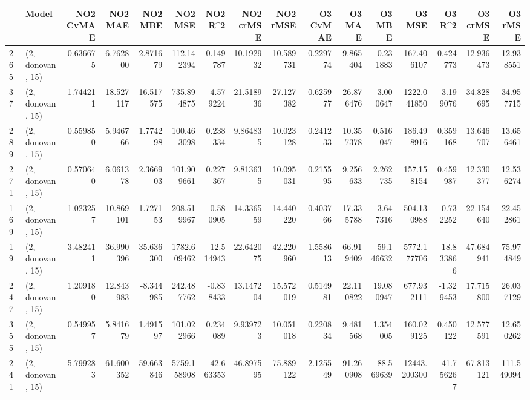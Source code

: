 \begin{tabular}{llrrrrrrrrrrrrrr}
\toprule
{} &             Model &  NO2 CvMAE &    NO2 MAE &    NO2 MBE &      NO2 MSE &    NO2 R\textasciicircum2 &  NO2 crMSE &   NO2 rMSE &  O3 CvMAE &     O3 MAE &     O3 MBE &        O3 MSE &      O3 R\textasciicircum2 &    O3 crMSE &     O3 rMSE \\
\midrule
265 &  (2, donovan, 15) &   0.636675 &   6.762800 &   2.871679 &   112.142394 &   0.149787 &  10.192932 &  10.589731 &  0.229774 &   9.865404 &  -0.231883 &    167.406107 &    0.424773 &   12.936473 &   12.938551 \\
37  &  (2, donovan, 15) &   1.744211 &  18.527117 &  16.517575 &   735.894875 &  -4.579224 &  21.518936 &  27.127382 &  0.625977 &  26.876476 &  -3.000647 &   1222.041850 &   -3.199076 &   34.828695 &   34.957715 \\
289 &  (2, donovan, 15) &   0.559850 &   5.946766 &   1.774298 &   100.463098 &   0.238334 &   9.864835 &  10.023128 &  0.241233 &  10.357378 &   0.516047 &    186.498916 &    0.359168 &   13.646707 &   13.656461 \\
271 &  (2, donovan, 15) &   0.570640 &   6.061378 &   2.366903 &   101.909661 &   0.227367 &   9.813635 &  10.095031 &  0.215595 &   9.256633 &   2.262735 &    157.158154 &    0.459987 &   12.330377 &   12.536274 \\
169 &  (2, donovan, 15) &   1.023257 &  10.869101 &   1.727153 &   208.519967 &  -0.580905 &  14.336559 &  14.440220 &  0.403766 &  17.335788 &  -3.647316 &    504.130988 &   -0.732252 &   22.154640 &   22.452861 \\
19  &  (2, donovan, 15) &   3.482411 &  36.990396 &  35.636300 &  1782.609462 & -12.514943 &  22.642075 &  42.220960 &  1.558613 &  66.919409 & -59.146632 &   5772.177706 &  -18.833866 &   47.684941 &   75.974849 \\
247 &  (2, donovan, 15) &   1.209180 &  12.843983 &  -8.344985 &   242.487762 &  -0.838433 &  13.147204 &  15.572019 &  0.514981 &  22.110822 &  19.080947 &    677.932111 &   -1.329453 &   17.715800 &   26.037129 \\
355 &  (2, donovan, 15) &   0.549957 &   5.841679 &   1.491597 &   101.022966 &   0.234089 &   9.939723 &  10.051018 &  0.220834 &   9.481568 &   1.354005 &    160.029125 &    0.450122 &   12.577591 &   12.650262 \\
241 &  (2, donovan, 15) &   5.799283 &  61.600352 &  59.663846 &  5759.158908 & -42.663353 &  46.897595 &  75.889122 &  2.125549 &  91.260908 & -88.569639 &  12443.200300 &  -41.756267 &   67.813121 &  111.549094 \\

\end{tabular}
